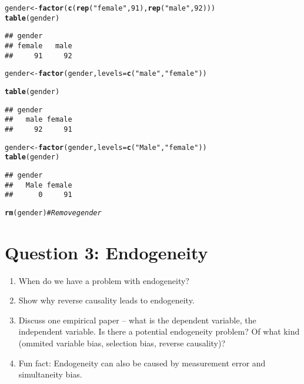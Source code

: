 \documentclass{article}\usepackage[]{graphicx}\usepackage[]{color}
\makeatletter
\newcommand{\hlnum}[1]{\textcolor[rgb]{0.686,0.059,0.569}{#1}}%
\newcommand{\hlstr}[1]{\textcolor[rgb]{0.192,0.494,0.8}{#1}}%
\newcommand{\hlcom}[1]{\textcolor[rgb]{0.678,0.584,0.686}{\textit{#1}}}%
\newcommand{\hlstd}[1]{\textcolor[rgb]{0.345,0.345,0.345}{#1}}%
\newcommand{\hlkwb}[1]{\textcolor[rgb]{0.69,0.353,0.396}{#1}}%
\newcommand{\hlkwc}[1]{\textcolor[rgb]{0.333,0.667,0.333}{#1}}%
\newcommand{\hlkwd}[1]{\textcolor[rgb]{0.737,0.353,0.396}{\textbf{#1}}}%
\newenvironment{kframe}{%
 \def\at@end@of@kframe{}%
 \ifinner\ifhmode%
  \def\at@end@of@kframe{\end{minipage}}%
  \begin{minipage}{\columnwidth}%
 \fi\fi%
 \def\FrameCommand##1{\hskip\@totalleftmargin \hskip-\fboxsep
 \colorbox{shadecolor}{##1}\hskip-\fboxsep
     \hskip-\linewidth \hskip-\@totalleftmargin \hskip\columnwidth}%
 \MakeFramed {\advance\hsize-\width
   \@totalleftmargin\z@ \linewidth\hsize
   \@setminipage}}%
 {\par\unskip\endMakeFramed%
 \at@end@of@kframe}
\newenvironment{knitrout}{}{} %
\makeatother
\begin{document}
\begin{knitrout}
\color{fgcolor}\begin{kframe}
\begin{alltt}
\hlstd{gender} \hlkwb{<-} \hlkwd{factor}\hlstd{(}\hlkwd{c}\hlstd{(}\hlkwd{rep}\hlstd{(}\hlstr{"female"}\hlstd{,} \hlnum{91}\hlstd{),} \hlkwd{rep}\hlstd{(}\hlstr{"male"}\hlstd{,} \hlnum{92}\hlstd{)))}
\hlkwd{table}\hlstd{(gender)}
\end{alltt}
\begin{verbatim}
## gender
## female   male 
##     91     92
\end{verbatim}
\begin{alltt}
\hlstd{gender} \hlkwb{<-} \hlkwd{factor}\hlstd{(gender,} \hlkwc{levels}\hlstd{=}\hlkwd{c}\hlstd{(}\hlstr{"male"}\hlstd{,} \hlstr{"female"}\hlstd{))}
\end{alltt}
\end{kframe}
\end{knitrout}
\begin{knitrout}
\color{fgcolor}\begin{kframe}
\begin{alltt}
\hlkwd{table}\hlstd{(gender)}
\end{alltt}
\begin{verbatim}
## gender
##   male female 
##     92     91
\end{verbatim}
\begin{alltt}
\hlstd{gender} \hlkwb{<-} \hlkwd{factor}\hlstd{(gender,} \hlkwc{levels}\hlstd{=}\hlkwd{c}\hlstd{(}\hlstr{"Male"}\hlstd{,} \hlstr{"female"}\hlstd{))}
\hlkwd{table}\hlstd{(gender)}
\end{alltt}
\begin{verbatim}
## gender
##   Male female 
##      0     91
\end{verbatim}
\begin{alltt}
\hlkwd{rm}\hlstd{(gender)}                  \hlcom{# Remove gender}
\end{alltt}
\end{kframe}
\end{knitrout}

\section{Question 3: Endogeneity}
\begin{enumerate}
\item When do we have a problem with endogeneity?
\item Show why reverse causality leads to endogeneity.
\item Discuss one empirical paper -- what is the dependent variable, the independent variable. Is there a potential endogeneity problem? Of what kind (ommited variable bias, selection bias, reverse causality)?
\item Fun fact: Endogeneity can also be caused by measurement error and simultaneity bias.
\end{enumerate}
\end{document}
